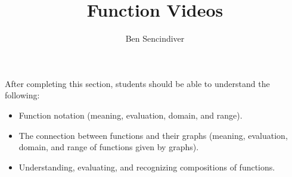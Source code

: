 \documentclass{ximera}
\title{Function Videos}
\author{Ben Sencindiver}
\begin{document}
\begin{abstract}
\end{abstract}

\maketitle

\begin{sectionOutcomes}
After completing this section, students should be able to understand the following:

\begin{itemize}
	\item Function notation (meaning, evaluation, domain, and range).
    \item The connection between functions and their graphs (meaning, evaluation, domain, and range of functions given by graphs).
    \item Understanding, evaluating, and recognizing compositions of functions.
\end{itemize}


\end{sectionOutcomes}
\end{document}
